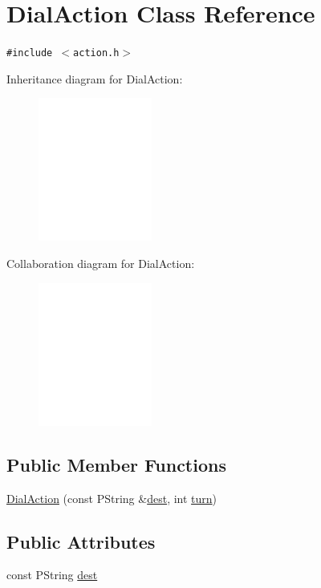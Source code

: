 \hypertarget{classDialAction}{
\section{DialAction Class Reference}
\label{classDialAction}
}
{\tt \#include $<$action.h$>$}

Inheritance diagram for DialAction:\nopagebreak
\begin{figure}[H]
\begin{center}
\leavevmode
\includegraphics[width=106pt]{classDialAction__inherit__graph}
\end{center}
\end{figure}
Collaboration diagram for DialAction:\nopagebreak
\begin{figure}[H]
\begin{center}
\leavevmode
\includegraphics[width=106pt]{classDialAction__coll__graph}
\end{center}
\end{figure}
\subsection*{Public Member Functions}
\begin{CompactItemize}
\item 
\hyperlink{classDialAction_a6a4f34c622b886eedb04dca71e6baf7}{DialAction} (const PString \&\hyperlink{classDialAction_bd0ac2dd8e233138e05392eee0c743c7}{dest}, int \hyperlink{classAction_51e5d56a6aa4a037e90df19587a225c7}{turn})
\end{CompactItemize}
\subsection*{Public Attributes}
\begin{CompactItemize}
\item 
const PString \hyperlink{classDialAction_bd0ac2dd8e233138e05392eee0c743c7}{dest}
\end{CompactItemize}


